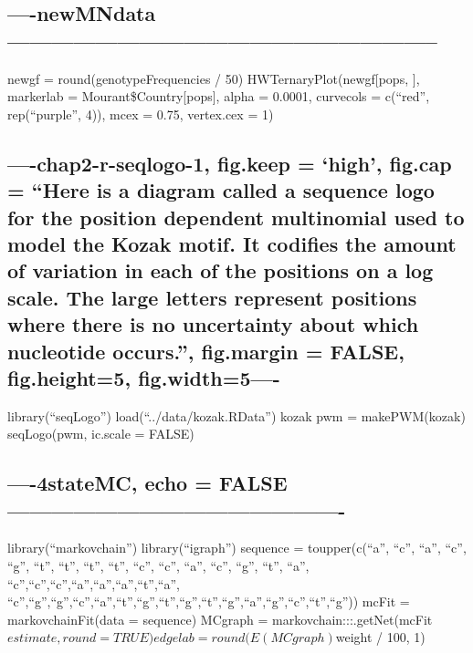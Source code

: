 \documentclass[]{article}
\begin{document}
\subsection{----newMNdata-----------------------------------------------------------}\label{newmndata}

newgf = round(genotypeFrequencies / 50) HWTernaryPlot(newgf{[}pops, {]},
markerlab = Mourant\$Country{[}pops{]}, alpha = 0.0001, curvecols =
c(``red'', rep(``purple'', 4)), mcex = 0.75, vertex.cex = 1)

\subsection{\texorpdfstring{----chap2-r-seqlogo-1, fig.keep = `high',
fig.cap = ``Here is a diagram called a sequence logo for the position
dependent multinomial used to model the Kozak motif. It codifies the
amount of variation in each of the positions on a log scale. The large
letters represent positions where there is no uncertainty about which
nucleotide occurs.'', fig.margin = FALSE, fig.height=5,
fig.width=5----}{----chap2-r-seqlogo-1, fig.keep = high, fig.cap = Here is a diagram called a sequence logo for the position dependent multinomial used to model the Kozak motif. It codifies the amount of variation in each of the positions on a log scale. The large letters represent positions where there is no uncertainty about which nucleotide occurs., fig.margin = FALSE, fig.height=5, fig.width=5----}}\label{chap2-r-seqlogo-1-fig.keep-high-fig.cap-here-is-a-diagram-called-a-sequence-logo-for-the-position-dependent-multinomial-used-to-model-the-kozak-motif.-it-codifies-the-amount-of-variation-in-each-of-the-positions-on-a-log-scale.-the-large-letters-represent-positions-where-there-is-no-uncertainty-about-which-nucleotide-occurs.-fig.margin-false-fig.height5-fig.width5-}

library(``seqLogo'') load(``../data/kozak.RData'') kozak pwm =
makePWM(kozak) seqLogo(pwm, ic.scale = FALSE)

\subsection{----4stateMC, echo =
FALSE----------------------------------------------}\label{statemc-echo-false-}

library(``markovchain'') library(``igraph'') sequence = toupper(c(``a'',
``c'', ``a'', ``c'', ``g'', ``t'', ``t'', ``t'', ``t'', ``c'', ``c'',
``a'', ``c'', ``g'', ``t'', ``a'',
``c'',``c'',``c'',``a'',``a'',``a'',``t'',``a'',
``c'',``g'',``g'',``c'',``a'',``t'',``g'',``t'',``g'',``t'',``g'',``a'',``g'',``c'',``t'',``g''))
mcFit = markovchainFit(data = sequence) MCgraph =
markovchain:::.getNet(mcFit\(estimate, round = TRUE) edgelab = round(E(MCgraph)\)weight
/ 100, 1)
\end{document}
